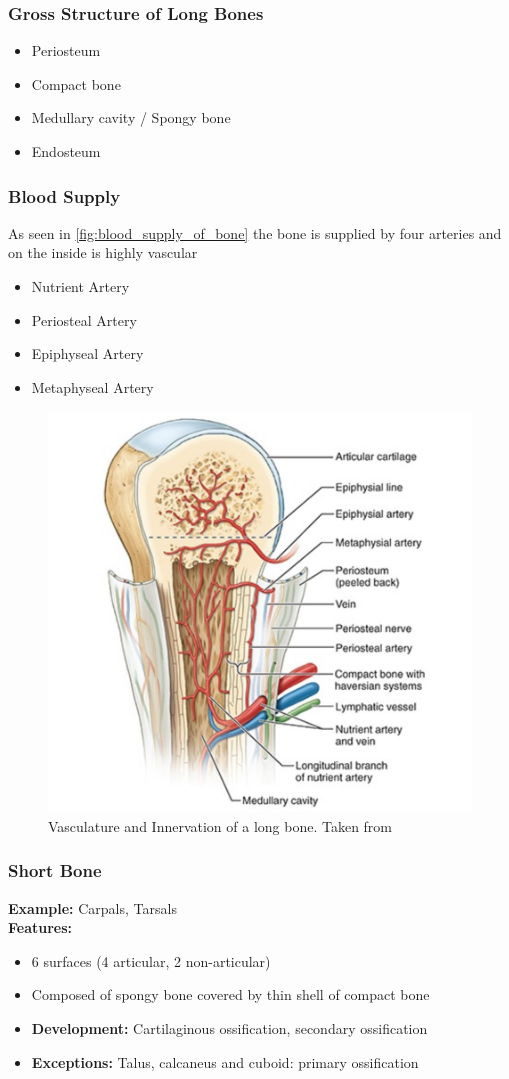 \documentclass[11pt]{article}
\begin{document}
\subsubsection*{Gross Structure of Long Bones}
\begin{itemize}
    \item Periosteum
    \item Compact bone
    \item Medullary cavity / Spongy bone
    \item Endosteum
\end{itemize}

\subsubsection*{Blood Supply}
As seen in \autoref{fig:blood_supply_of_bone} the bone is supplied by four arteries and on the inside is highly vascular
\begin{itemize}
    \item Nutrient Artery
    \item Periosteal Artery
    \item Epiphyseal Artery
    \item Metaphyseal Artery
\end{itemize}

\begin{figure}[htbp]
    \centering
    \includegraphics[width=0.5\linewidth]{Figures/blood_supply_of_bone.png}
    \caption{Vasculature and Innervation of a long bone. Taken from \cite[p.~120]{moore2023}}
    \label{fig:blood_supply_of_bone}
\end{figure}

\subsubsection*{Short Bone}
\textbf{Example:} Carpals, Tarsals\\
\textbf{Features:}
\begin{itemize}
    \item 6 surfaces (4 articular, 2 non-articular)
    \item Composed of spongy bone covered by thin shell of compact bone
    \item \textbf{Development:} Cartilaginous ossification, secondary ossification
    \item \textbf{Exceptions:} Talus, calcaneus and cuboid: primary ossification
\end{itemize}
\end{document}

